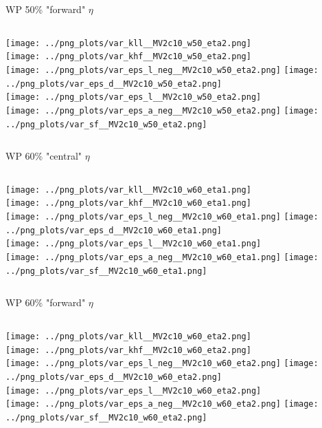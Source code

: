 \documentclass[pdflatex,8pt]{beamer}
\begin{document}
\begin{frame}{WP 50\% "forward" $\eta$}
  \begin{columns}[t]
    \centering
    \texttt{[image: ../png\_plots/var\_kll\_\_MV2c10\_w50\_eta2.png]}\\
    \texttt{[image: ../png\_plots/var\_khf\_\_MV2c10\_w50\_eta2.png]}\\
    \texttt{[image: ../png\_plots/var\_eps\_l\_neg\_\_MV2c10\_w50\_eta2.png]}
    \centering
    \texttt{[image: ../png\_plots/var\_eps\_d\_\_MV2c10\_w50\_eta2.png]}\\
    \texttt{[image: ../png\_plots/var\_eps\_l\_\_MV2c10\_w50\_eta2.png]}\\
    \texttt{[image: ../png\_plots/var\_eps\_a\_neg\_\_MV2c10\_w50\_eta2.png]}
    \texttt{[image: ../png\_plots/var\_sf\_\_MV2c10\_w50\_eta2.png]}
  \end{columns}
\end{frame}

\begin{frame}{WP 60\% "central" $\eta$}
  \begin{columns}[t]
    \centering
    \texttt{[image: ../png\_plots/var\_kll\_\_MV2c10\_w60\_eta1.png]}\\
    \texttt{[image: ../png\_plots/var\_khf\_\_MV2c10\_w60\_eta1.png]}\\
    \texttt{[image: ../png\_plots/var\_eps\_l\_neg\_\_MV2c10\_w60\_eta1.png]}
    \centering
    \texttt{[image: ../png\_plots/var\_eps\_d\_\_MV2c10\_w60\_eta1.png]}\\
    \texttt{[image: ../png\_plots/var\_eps\_l\_\_MV2c10\_w60\_eta1.png]}\\
    \texttt{[image: ../png\_plots/var\_eps\_a\_neg\_\_MV2c10\_w60\_eta1.png]}
    \texttt{[image: ../png\_plots/var\_sf\_\_MV2c10\_w60\_eta1.png]}
  \end{columns}
\end{frame}

\begin{frame}{WP 60\% "forward" $\eta$}
  \begin{columns}[t]
    \centering
    \texttt{[image: ../png\_plots/var\_kll\_\_MV2c10\_w60\_eta2.png]}\\
    \texttt{[image: ../png\_plots/var\_khf\_\_MV2c10\_w60\_eta2.png]}\\
    \texttt{[image: ../png\_plots/var\_eps\_l\_neg\_\_MV2c10\_w60\_eta2.png]}
    \centering
    \texttt{[image: ../png\_plots/var\_eps\_d\_\_MV2c10\_w60\_eta2.png]}\\
    \texttt{[image: ../png\_plots/var\_eps\_l\_\_MV2c10\_w60\_eta2.png]}\\
    \texttt{[image: ../png\_plots/var\_eps\_a\_neg\_\_MV2c10\_w60\_eta2.png]}
    \texttt{[image: ../png\_plots/var\_sf\_\_MV2c10\_w60\_eta2.png]}
  \end{columns}
\end{frame}
\end{document}
